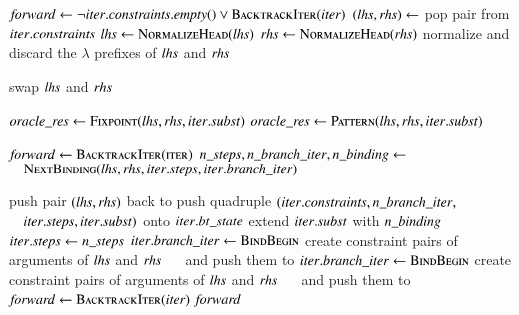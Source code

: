 \vspace{\jot}
\begin{algorithmic}[]
  \State $\mathit{forward} \gets \neg \mathit{iter.constraints.empty()} \lor \textsc{BacktrackIter}(\mathit{iter})$
    \State $(\mathit{lhs}, \mathit{rhs}) \gets $ pop pair from $\mathit{iter.constraints}$
    \State $\mathit{lhs} \gets \textsc{NormalizeHead}(\mathit{lhs})$
    \State $\mathit{rhs} \gets \textsc{NormalizeHead}(\mathit{rhs})$
    \State normalize and discard the $\lambda$ prefixes of $\mathit{lhs}$ and $\mathit{rhs}$

      \State swap $\mathit{lhs}$ and $\mathit{rhs}$
    \EndIf

      \State $\mathit{oracle\_res} \gets \textsc{Fixpoint}(\mathit{lhs, rhs, iter.subst}) $
        \State $\mathit{oracle\_res} \gets \textsc{Pattern}(\mathit{lhs, rhs, iter.subst}) $
      \EndIf

        \State $\mathit{forward} \gets \textsc{BacktrackIter(iter)}$
        \State $\mathit{n\_steps}, \mathit{n\_branch\_iter}, \mathit{n\_binding} \gets$
        \State $\quad \textsc{NextBinding}(\mathit{lhs}, \mathit{rhs}, \mathit{iter.steps}, \mathit{iter.branch\_iter})$
        
          \State push pair $(\mathit{lhs},\mathit{rhs})$ back to 
          \State push quadruple $(\mathit{iter.constraints}, \mathit{n\_branch\_iter}, $
          \State                  $\quad \mathit{iter.steps}, \mathit{iter.subst})$ onto $\mathit{iter.bt\_state}$
          \State extend $\mathit{iter.subst}$ with $\mathit{n\_binding}$
          \State $\mathit{iter.steps} \gets \mathit{n\_steps}$
          \State $\mathit{iter.branch\_iter} \gets \textsc{BindBegin}$
          \State create constraint pairs of arguments of $\mathit{lhs}$ and $\mathit{rhs}$
          \State $\quad$ and push them to 
          \State $\mathit{iter.branch\_iter} \gets \textsc{BindBegin}$
        \EndIf
      \EndIf
      \State create constraint pairs of arguments of $\mathit{lhs}$ and $\mathit{rhs}$
      \State $\quad$ and push them to 
    \Else{} \State $\mathit{forward} \gets \textsc{BacktrackIter(\ensuremath{\mathit{iter}})}$
    \EndIf
  \EndWhile
  \State \Return $\mathit{forward}$
  \EndFunction
  

\end{algorithmic}
